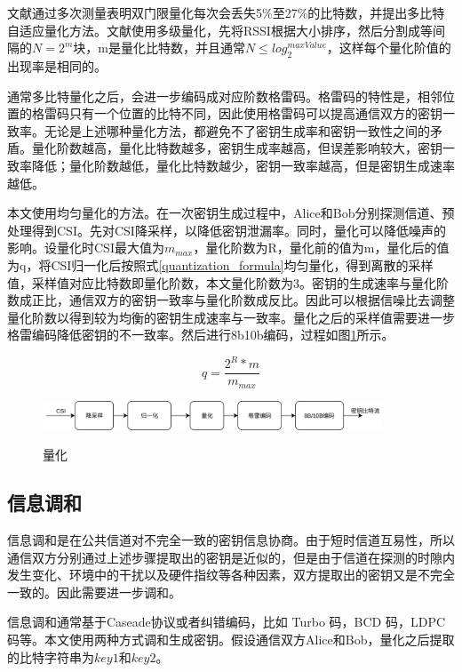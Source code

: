 \documentclass[master]{seuthesis} %
\begin{document}
\begin{Main}
文献\citet{patwari2009high}通过多次测量表明双门限量化每次会丢失5\%至27\%的比特数，并提出多比特自适应量化方法。文献\citet{yasukawa2008secret}使用多级量化，先将RSSI根据大小排序，然后分割成等间隔的$N = 2^m$块，m是量化比特数，并且通常$N \leq log_2^{maxValue}$，这样每个量化阶值的出现率是相同的。

通常多比特量化之后，会进一步编码成对应阶数格雷码。格雷码的特性是，相邻位置的格雷码只有一个位置的比特不同，因此使用格雷码可以提高通信双方的密钥一致率。无论是上述哪种量化方法，都避免不了密钥生成率和密钥一致性之间的矛盾。量化阶数越高，量化比特数越多，密钥生成率越高，但误差影响较大，密钥一致率降低；量化阶数越低，量化比特数越少，密钥一致率越高，但是密钥生成速率越低。

本文使用均匀量化的方法。在一次密钥生成过程中，Alice和Bob分别探测信道、预处理得到CSI。先对CSI降采样，以降低密钥泄漏率\cite{linning2019investigation}。同时，量化可以降低噪声的影响\cite{wang2015survey}。设量化时CSI最大值为$m_{max}$，量化阶数为R，量化前的值为m，量化后的值为q，将CSI归一化后按照式\ref{quantization_formula}均匀量化，得到离散的采样值，采样值对应比特数即量化阶数，本文量化阶数为3。密钥的生成速率与量化阶数成正比，通信双方的密钥一致率与量化阶数成反比。因此可以根据信噪比去调整量化阶数以得到较为均衡的密钥生成速率与一致率。量化之后的采样值需要进一步格雷编码降低密钥的不一致率。然后进行8b10b编码，过程如图\ref{quantization}所示。

\begin{equation} \label{quantization_formula}
    q = \frac{2^R * m}{m_{max}}
\end{equation}

\begin{figure}
    \centering
    \includegraphics[width=0.9\textwidth]{images/quantization}
    \caption{量化}{} %
    \label{quantization}
\end{figure}

\subsection{信息调和}

信息调和是在公共信道对不完全一致的密钥信息协商。由于短时信道互易性，所以通信双方分别通过上述步骤提取出的密钥是近似的，但是由于信道在探测的时隙内发生变化、环境中的干扰以及硬件指纹等各种因素，双方提取出的密钥又是不完全一致的。因此需要进一步调和。

信息调和通常基于Caseade协议\cite{Kitano2007A}或者纠错编码，比如 Turbo 码，BCD 码，LDPC 码等\cite{peng2018securing}。本文使用两种方式调和生成密钥。假设通信双方Alice和Bob，量化之后提取的比特字符串为$key1$和$key2$。


\end{Main}
\end{document}

